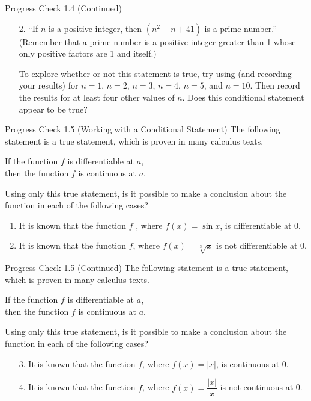 \documentclass{beamer}
\begin{document}
\begin{frame}{Progress Check 1.4 (Continued)}
	\begin{enumerate}
		\item[2.] ``If $n$ is a positive integer, then $(n^2 - n + 41)$ is a prime number.'' (Remember
		that a prime number is a positive integer greater than 1 whose only positive
		factors are 1 and itself.)
		
		To explore whether or not this statement is true, try using (and recording
		your results) for $n=1$, $n=2$, $n = 3$, $n=4$, $n=5$, and $n=10$. Then
		record the results for at least four other values of $n$. Does this conditional
		statement appear to be true?
	\end{enumerate}
\end{frame}

\begin{frame}{Progress Check 1.5 (Working with a Conditional Statement)}
	The following statement is a true statement, which is proven in many calculus texts.
	\begin{center}
		If the function $f$ is differentiable at $a$,\\ then the function $f$ is continuous at $a$.
	\end{center}
	Using only this true statement, is it possible to make a conclusion about the function in each of the following cases?
	\begin{enumerate}
		\item It is known that the function $f$ , where $f(x) = \sin x$, is differentiable at 0. \pause
		\item It is known that the function $f$, where $f(x) = \sqrt[3]{x}$ is not differentiable at 0.
	\end{enumerate}
\end{frame}

\begin{frame}{Progress Check 1.5 (Continued)}
	The following statement is a true statement, which is proven in many calculus texts.
	\begin{center}
		If the function $f$ is differentiable at $a$,\\ then the function $f$ is continuous at $a$.
	\end{center}
	Using only this true statement, is it possible to make a conclusion about the function in each of the following cases?
	\begin{enumerate}
		\item[3.] It is known that the function $f$, where $f(x) = |x|$, is continuous at 0. \pause
		\item[4.] It is known that the function $f$, where $f(x) = \dfrac{|x|}{x}$ is not continuous at 0.
	\end{enumerate}
\end{frame}
\end{document}
